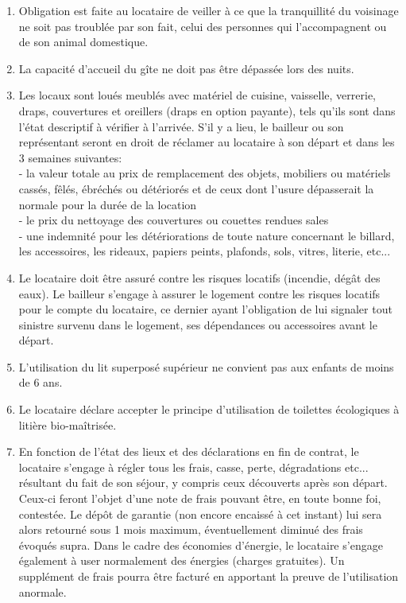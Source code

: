 \documentclass[a4paper,11pt]{article}
\begin{document}
\begin{enumerate}
\item Obligation est faite au locataire de veiller à ce que la tranquillité du voisinage ne soit pas troublée par son fait, celui des personnes qui l'accompagnent ou de son animal domestique.

\item La capacité d'accueil du gîte ne doit pas être dépassée lors des nuits.



\item Les locaux sont loués meublés avec matériel de cuisine, vaisselle, verrerie, draps, couvertures et oreillers (draps en option payante), tels qu’ils sont dans l’état descriptif à vérifier à l'arrivée.
S’il y a lieu, le bailleur ou son représentant seront en droit de réclamer au locataire à son départ et dans les 3 semaines suivantes:\\
- la valeur totale au prix de remplacement des objets, mobiliers ou matériels cassés, fêlés, ébréchés ou détériorés et de ceux dont l’usure dépasserait la normale pour la durée de la location\\
- le prix du nettoyage des couvertures ou couettes rendues sales\\
- une indemnité pour les détériorations de toute nature concernant le billard, les accessoires, les rideaux, papiers peints, plafonds, sols, vitres, literie, etc...\\



\item Le locataire doit être assuré contre les risques locatifs (incendie, dégât des eaux). 
Le bailleur s'engage à assurer le logement contre les risques locatifs pour le compte du locataire, ce dernier ayant l'obligation de lui signaler  tout sinistre survenu dans le logement, ses dépendances ou accessoires avant le départ.

\item L'utilisation du lit superposé supérieur ne convient pas aux enfants de moins de 6 ans.

\item Le locataire déclare accepter le principe d'utilisation de toilettes écologiques à litière bio-maîtrisée.

\item En fonction de l’état des lieux et des déclarations en fin de contrat, le locataire s’engage à régler tous les frais, casse, perte, dégradations etc... résultant du fait de son séjour, y compris ceux découverts après son départ.
Ceux-ci feront l'objet d'une note de frais pouvant être, en toute bonne foi, contestée. 
Le dépôt de garantie (non encore encaissé à cet instant) lui sera alors retourné sous 1 mois maximum, éventuellement diminué des frais évoqués supra.
Dans le cadre des économies d’énergie, le locataire s’engage également à user normalement des énergies (charges gratuites).
Un supplément de frais pourra être facturé en apportant la preuve de l’utilisation anormale.


\end{enumerate}
\end{document}
